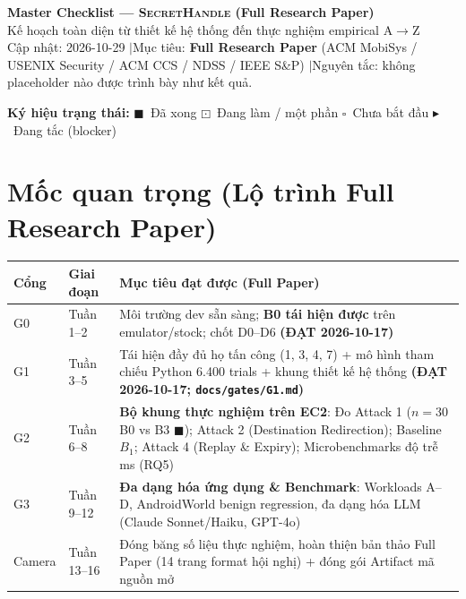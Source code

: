 \documentclass[11pt,a4paper]{article}
\newcommand{\done}{\textcolor{shgreen}{$\blacksquare$}}
\newcommand{\doing}{\textcolor{shblue}{$\boxdot$}}
\newcommand{\todo}{\textcolor{shgray}{$\square$}}
\newcommand{\block}{\textcolor{shred}{$\blacktriangleright$}}
\newcommand{\code}[1]{\texttt{\small #1}}
\newcommand{\SH}{\textsc{SecretHandle}}
\begin{document}
\begin{center}
{\color{shblue}\LARGE\bfseries Master Checklist --- \SH{} (Full Research Paper)}\\[4pt]
{\large Kế hoạch toàn diện từ thiết kế hệ thống đến thực nghiệm empirical A$\to$Z}\\[4pt]
{\small\color{shgray} Cập nhật: 2026-10-29 \quad$\vert$\quad Mục tiêu: \textbf{Full Research Paper} (ACM MobiSys / USENIX Security / ACM CCS / NDSS / IEEE S\&P) \quad$\vert$\quad Nguyên tắc: không placeholder nào được trình bày như kết quả.}
\end{center}

\vspace{0.3em}
\noindent\textbf{Ký hiệu trạng thái:}\quad
\done{}~Đã xong\quad
\doing{}~Đang làm / một phần\quad
\todo{}~Chưa bắt đầu\quad
\block{}~Đang tắc (blocker)

\vspace{0.6em}
\section*{Mốc quan trọng (Lộ trình Full Research Paper)}
\begin{tabularx}{\textwidth}{@{}p{1.4cm}p{2.6cm}X@{}}
\toprule
\textbf{Cổng} & \textbf{Giai đoạn} & \textbf{Mục tiêu đạt được (Full Paper)} \\
\midrule
G0 & Tuần 1--2 & Môi trường dev sẵn sàng; \textbf{B0 tái hiện được} trên emulator/stock; chốt D0--D6 \quad\textbf{(ĐẠT 2026-10-17)} \\
G1 & Tuần 3--5 & Tái hiện đầy đủ họ tấn công (1, 3, 4, 7) + mô hình tham chiếu Python 6.400 trials + khung thiết kế hệ thống \quad\textbf{(ĐẠT 2026-10-17; \code{docs/gates/G1.md})} \\
G2 & Tuần 6--8 & \textbf{Bộ khung thực nghiệm trên EC2}: Đo Attack 1 ($n=30$ B0 vs B3 \done); Attack 2 (Destination Redirection); Baseline $B_1$; Attack 4 (Replay \& Expiry); Microbenchmarks độ trễ ms (RQ5) \\
G3 & Tuần 9--12 & \textbf{Đa dạng hóa ứng dụng \& Benchmark}: Workloads A--D, AndroidWorld benign regression, đa dạng hóa LLM (Claude Sonnet/Haiku, GPT-4o) \\
Camera & Tuần 13--16 & Đóng băng số liệu thực nghiệm, hoàn thiện bản thảo Full Paper (14 trang format hội nghị) + đóng gói Artifact mã nguồn mở \\
\bottomrule
\end{tabularx}

\vspace{0.6em}
\end{document}
